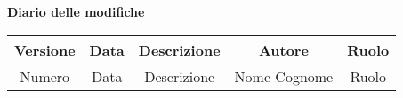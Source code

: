 	\begin{center}
		\textbf{Diario delle modifiche}
	\end{center}
	\begin{center}
		\begin{tabular}{|c|c|c|c|c|}
			\hline
			\textbf{Versione} & \textbf{Data} & \textbf{Descrizione} & \textbf{Autore} & \textbf{Ruolo} \\
			\hline
			Numero & Data & Descrizione & Nome Cognome & Ruolo\\
			\hline
		\end{tabular}
	\end{center}

\newpage